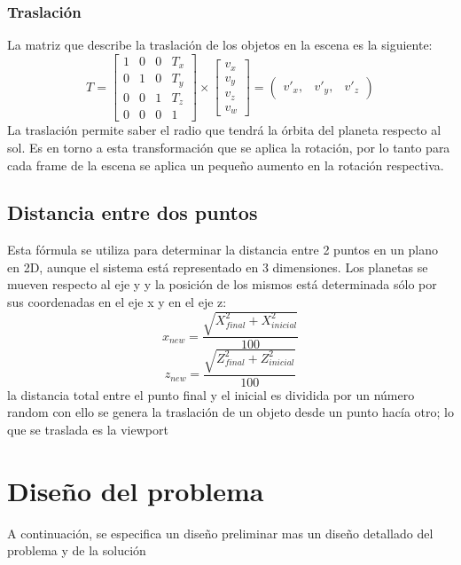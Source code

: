 \documentclass[12pt,journal,compsoc]{IEEEtran}
\begin{document}
\subsubsection{Traslación}
La matriz que describe la traslación de los objetos en la escena es la siguiente:\\

\[ 
	T = \left[ 
			\begin{array}{cccc}
				1 & 0 & 0 & T_{x} \\
				0 & 1 & 0 & T_{y} \\
				0 & 0 & 1 & T_{z} \\
				0 & 0 & 0 & 1 
			\end{array}
		\right] \times 
		\left[ 
			\begin{array}{c}
				v_{x} \\
				v_{y} \\
				v_{z} \\
				v_{w} 
			\end{array}
		\right] = 
		\left(
			\begin{array}{ccc}
				v'_{x} , & v'_{y} , & v'_{z}
			\end{array}
		\right)
\]
La traslación permite saber el radio que tendrá la órbita del planeta respecto al sol. Es en torno a esta transformación que se aplica la rotación, por lo tanto para cada frame de la escena se aplica un pequeño aumento en la rotación respectiva.\\
\subsection{Distancia entre dos puntos}
Esta fórmula se utiliza para determinar la distancia entre 2 puntos en un plano en 2D, aunque el sistema está representado en 3 dimensiones. Los planetas se mueven respecto al eje y y la posición de los mismos está determinada sólo por sus coordenadas en el eje x y en el eje z:\\
\[ 
	x_{new} = \frac{\sqrt{X_{final}^{2}+X_{inicial}^{2}}}{100} 
\]
\newline
\[
	z_{new} = \frac{\sqrt{Z_{final}^{2}+Z_{inicial}^{2}}}{100}
\]
\newline
la distancia total entre el punto final y el inicial es dividida por un número random con ello se genera la traslación de un objeto desde un punto hacía otro; lo que se traslada es la viewport
\section{Diseño del problema}
A continuación, se especifica un diseño preliminar mas un diseño detallado del problema y de la solución
\end{document}

